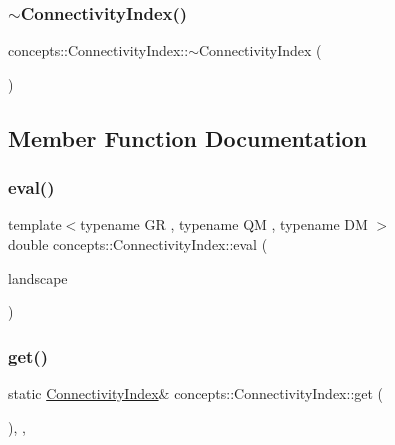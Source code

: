 \subsubsection{\texorpdfstring{$\sim$\+Connectivity\+Index()}{~ConnectivityIndex()}}
{\footnotesize\ttfamily concepts\+::\+Connectivity\+Index\+::$\sim$\+Connectivity\+Index (\begin{DoxyParamCaption}{ }\end{DoxyParamCaption})\hspace{0.3cm}{\ttfamily [inline]}}



\subsection{Member Function Documentation}
\mbox{\label{classconcepts_1_1_connectivity_index_a1718c62ef509fabe0ad1a54cf5a9b0ce}} 
\subsubsection{\texorpdfstring{eval()}{eval()}}
{\footnotesize\ttfamily template$<$typename GR , typename QM , typename DM $>$ \\
double concepts\+::\+Connectivity\+Index\+::eval (\begin{DoxyParamCaption}\item[{const \hyperlink{classconcepts_1_1_abstract_landscape}{concepts\+::\+Abstract\+Landscape}$<$ GR, QM, DM $>$ \&}]{landscape }\end{DoxyParamCaption})\hspace{0.3cm}{\ttfamily [inline]}}

\mbox{\label{classconcepts_1_1_connectivity_index_a4305f910870c1b5de783d770b35fea09}} 
\subsubsection{\texorpdfstring{get()}{get()}}
{\footnotesize\ttfamily static \hyperlink{classconcepts_1_1_connectivity_index}{Connectivity\+Index}\& concepts\+::\+Connectivity\+Index\+::get (\begin{DoxyParamCaption}{ }\end{DoxyParamCaption})\hspace{0.3cm}{\ttfamily [inline]}, {\ttfamily [static]}, {\ttfamily [noexcept]}}



